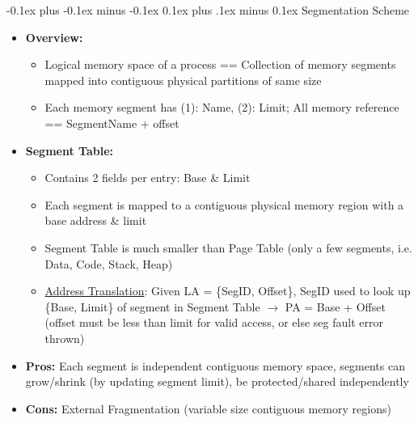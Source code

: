 \documentclass[landscape]{article}
\makeatletter
\renewcommand{\subsection}{\@startsection{subsection}{2}{0mm}%
  {-0.1ex plus -0.1ex minus -0.1ex}%
  {0.1ex plus .1ex minus 0.1ex}%
{\normalfont\scriptsize\bfseries}}
\makeatother
\begin{document}
\begin{multicols*}{6}
    \subsection{Segmentation Scheme}
    \begin{itemize}
      \item \textbf{Overview:}
      \begin{itemize}
        \item Logical memory space of a process == Collection of memory segments mapped into contiguous physical partitions of same size
        \item Each memory segment has (1): Name, (2): Limit; All memory reference == SegmentName + offset
      \end{itemize}
      \item \textbf{Segment Table:}
      \begin{itemize}
        \item Contains 2 fields per entry: Base \& Limit
        \item Each segment is mapped to a contiguous physical memory region with a base address \& limit
        \item Segment Table is much smaller than Page Table (only a few segments, i.e. Data, Code, Stack, Heap)
        \item \underline{Address Translation}: Given LA = \{SegID, Offset\}, SegID used to look up \{Base, Limit\} of segment in Segment Table $\rightarrow$ PA = Base + Offset (offset must be less than limit for valid access, or else seg fault error thrown)
      \end{itemize}
      \item \textbf{Pros:} Each segment is independent contiguous memory space, segments can grow/shrink (by updating segment limit), be protected/shared independently
      \item \textbf{Cons:} External Fragmentation (variable size contiguous memory regions)
    \end{itemize}


\end{multicols*}
\end{document}
